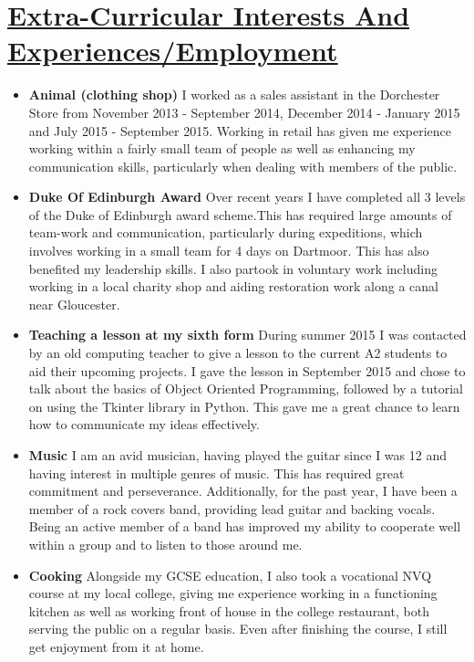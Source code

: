 \documentclass[11pt]{article}
\begin{document}
	\vspace{-20pt}
	\hspace{-100pt}\section*{\underline{Extra-Curricular Interests And Experiences/Employment}}
			\begin{itemize}
				\item \textbf{Animal (clothing shop) }I worked as a sales assistant in the Dorchester Store from November 2013 - September 2014, December 2014 - January 2015 and July 2015 - September 2015. Working in retail has given me experience working within a fairly small team of people as well as enhancing my communication skills, particularly when dealing with members of the public. 
				\item \textbf{Duke Of Edinburgh Award} Over recent years I have completed all 3 levels of the Duke of Edinburgh award scheme.This has required large amounts of team-work and communication, particularly during expeditions, which involves working in a small team for 4 days on Dartmoor. This has also benefited my leadership skills. I also partook in voluntary work including working in a local charity shop and aiding restoration work along a canal near Gloucester.
				\item \textbf{Teaching a lesson at my sixth form} During summer 2015 I was contacted by an old computing teacher to give a lesson to the current A2 students to aid their upcoming projects. I gave the lesson in September 2015 and chose to talk about the basics of Object Oriented Programming, followed by a tutorial on using the Tkinter library in Python. This gave me a great chance to learn how to communicate my ideas effectively. 
				\item \textbf{Music} I am an avid musician, having played the guitar since I was 12 and having interest in multiple genres of music. This has required great commitment and perseverance. Additionally, for the past year, I have been a member of a rock covers band, providing lead guitar and backing vocals. Being an active member of a band has improved my ability to cooperate well within a group and to listen to those around me. 
				\item \textbf{Cooking} Alongside my GCSE education, I also took a vocational NVQ course at my local college, giving me experience working in a functioning kitchen as well as working front of house in the college restaurant, both serving the public on a regular basis. Even after finishing the course, I still get enjoyment from it at home.
			\end{itemize}
\end{document}
